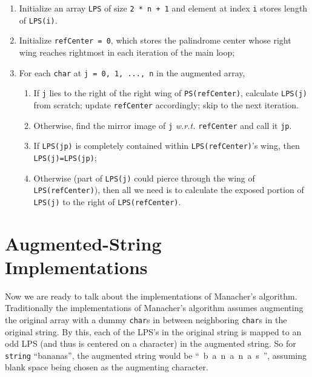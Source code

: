\documentclass[oneside,11pt]{book}
\theoremstyle{definition}
\theoremstyle{remark}
\newcommand{\code}[1]{\mbox{\lstinline{#1}}}
\begin{document}
\begin{alisting}[htb]
    \caption{\label{alg:lps-algorithm}
    Algorithm for calculating the length of LPS based on Manacher's algorithm}
    \begin{enumerate}
        \item Initialize an array \code{LPS} of size \code{2 * n + 1} and element at index \code{i}
        stores length of \code{LPS(i)}.
        \item Initialize \code{refCenter = 0}, which stores the palindrome center whose right wing
        reaches rightmost in each iteration of the main loop;
        \item For each \code{char} at \code{j = 0, 1, ..., n} in the augmented array,
        \begin{enumerate}[label={\roman*:}]
            \item If \code{j} lies to the right of the right wing of \code{PS(refCenter)},
            calculate \code{LPS(j)} from scratch;
            update \code{refCenter} accordingly;
            skip to the next iteration.
            \item Otherwise, find the mirror image of \code{j}
            \textit{w.r.t.} \code{refCenter} and call it \code{jp}.
            \item If \code{LPS(jp)} is completely contained within \code{LPS(refCenter)}'s wing,
            then \code{LPS(j)=LPS(jp)};
            \item Otherwise (part of \code{LPS(j)} could pierce through
            the wing of \code{LPS(refCenter)}),
            then all we need is to calculate the exposed portion of \code{LPS(j)} to the right of
            \code{LPS(refCenter)}.
        \end{enumerate}
    \end{enumerate}
\end{alisting}


\section{Augmented-String Implementations}\label{sec:implementation-lps-augmented}

Now we are ready to talk about the implementations of Manacher's algorithm.
Traditionally the implementations of Manacher's algorithm assumes augmenting the original array with
a dummy \code{char}s in between neighboring \code{char}s in the original string.
By this, each of the LPS's in the original string is mapped to an odd LPS (and thus is centered
on a character) in the augmented string.
So for \code{string} \mbox{``bananas''}, the augmented string would be \mbox{`` b a n a n a s ''},
assuming blank space being chosen as the augmenting character.
\end{document}
